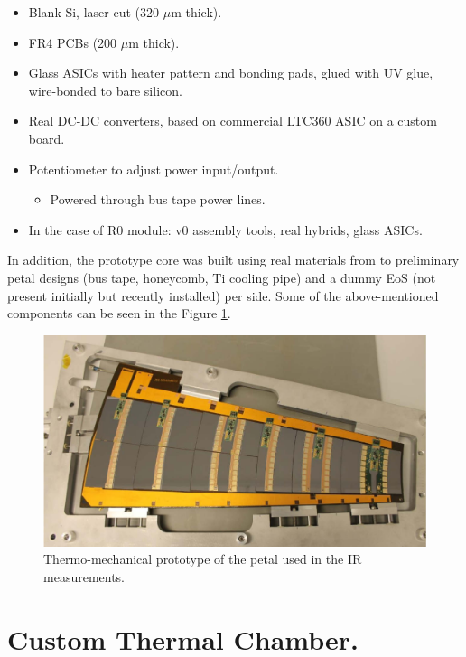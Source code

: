 		\begin{itemize}
			\renewcommand{\labelitemi}{$\diamond$}
			\item Blank Si, laser cut (320 $\mu$m thick).
			\item FR4 PCBs (200 $\mu$m thick).
			\item Glass ASICs with heater pattern and bonding pads, glued with UV glue, wire-bonded to bare silicon.
			\item Real DC-DC converters, based on commercial LTC360 ASIC on a custom board.
			\item Potentiometer to adjust power input/output.
			\begin{itemize}
			\renewcommand{\labelitemi}{$\bullet$}
				\item Powered through bus tape power lines.
			\end{itemize}
			\item In the case of R0 module: v0 assembly tools, real hybrids, glass ASICs.
		\end{itemize}
		
		In addition, the prototype core was built using real materials from to preliminary petal designs (bus tape, honeycomb, Ti cooling pipe) and a dummy EoS (not present initially but recently installed) per side. Some of the above-mentioned components can be seen in the Figure \ref{fig2.2}.
		
		\begin{figure}[ht!]
			\centering
			\captionsetup{justification=centering,margin=2cm}
			\includegraphics[scale=0.35]{Figures/Chapter02/PetalConstruction.jpg}
			\caption{Thermo-mechanical prototype of the petal  used in the IR measurements.}\label{fig2.2}
		\end{figure}\bigskip
		
	\section{Custom Thermal Chamber. }\label{section2.2}
	
